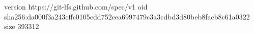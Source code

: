 version https://git-lfs.github.com/spec/v1
oid sha256:da000f3a243cffc0105cdd752cea6997479c3a3cdbd3d80beb8facb8c61a0322
size 393312
